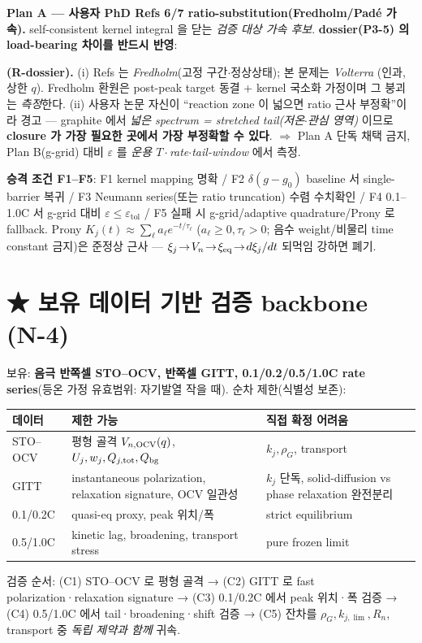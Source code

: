 \textbf{Plan A — 사용자 PhD Refs 6/7 \cite{lee2011,son2013} ratio-substitution(Fredholm/Padé 가속).}
self-consistent kernel integral 을 닫는 \emph{검증 대상 가속 후보}. \textbf{dossier(P3-5) 의
load-bearing 차이를 반드시 반영}:
\begin{boundbox}
\textbf{(R-dossier).} (i) Refs 는 \emph{Fredholm}(고정 구간$\cdot$정상상태); 본 문제는 \emph{Volterra}
(인과, 상한 $q$). Fredholm 환원은 post-peak target 동결 + kernel 국소화 가정이며 그 붕괴는
\emph{측정}한다. (ii) 사용자 논문 자신이 ``reaction zone 이 넓으면 ratio 근사 부정확''이라 경고 —
graphite 에서 \emph{넓은 spectrum = stretched tail(저온$\cdot$관심 영역)} 이므로 \textbf{closure 가 가장
필요한 곳에서 가장 부정확할 수 있다}. $\Rightarrow$ Plan A 단독 채택 금지, Plan B(g-grid) 대비
$\varepsilon$ 를 \emph{운용 $T\cdot$rate$\cdot$tail-window} 에서 측정.
\end{boundbox}
\textbf{승격 조건 F1--F5}: F1 kernel mapping 명확 / F2 $\delta(g-g_0)$ baseline 서 single-barrier
복귀 / F3 Neumann series(또는 ratio truncation) 수렴 수치확인 / F4 0.1--1.0C 서 g-grid 대비
$\varepsilon\le\varepsilon_\mathrm{tol}$ / F5 실패 시 g-grid/adaptive quadrature/Prony 로 fallback.
Prony $K_j(t)\approx\sum_\ell a_\ell e^{-t/\tau_\ell}$ ($a_\ell\ge0,\tau_\ell>0$; 음수 weight/비물리
time constant 금지)은 준정상 근사 — $\xi_j\!\to\!V_n\!\to\!\xi_{\mathrm{eq}}\!\to\!d\xi_j/dt$ 되먹임 강하면 폐기.

\section{★ 보유 데이터 기반 검증 backbone (N-4)}\label{sec:ch6_validate}
보유: \textbf{음극 반쪽셀 STO--OCV, 반쪽셀 GITT, 0.1/0.2/0.5/1.0C rate series}(등온 가정 유효범위:
자기발열 작을 때). 순차 제한(식별성 보존):
\begin{longtable}{p{} p{} p{}}
\toprule 데이터 & 제한 가능 & 직접 확정 어려움 \\ \midrule \endhead
STO--OCV & 평형 골격 $V_{n,\mathrm{OCV}}(q)$, $U_j,w_j,Q_{j,\mathrm{tot}},Q_{\mathrm{bg}}$ & $k_j,\rho_G$, transport \\
GITT & instantaneous polarization, relaxation signature, OCV 일관성 & $k_j$ 단독, solid-diffusion vs phase relaxation 완전분리 \\
0.1/0.2C & quasi-eq proxy, peak 위치/폭 & strict equilibrium \\
0.5/1.0C & kinetic lag, broadening, transport stress & pure frozen limit \\
\bottomrule
\end{longtable}
검증 순서: (C1) STO--OCV 로 평형 골격 → (C2) GITT 로 fast polarization·relaxation signature →
(C3) 0.1/0.2C 에서 peak 위치·폭 검증 → (C4) 0.5/1.0C 에서 tail·broadening·shift 검증 →
(C5) 잔차를 $\rho_G,k_{j,\lim},R_n$, transport 중 \emph{독립 제약과 함께} 귀속.

